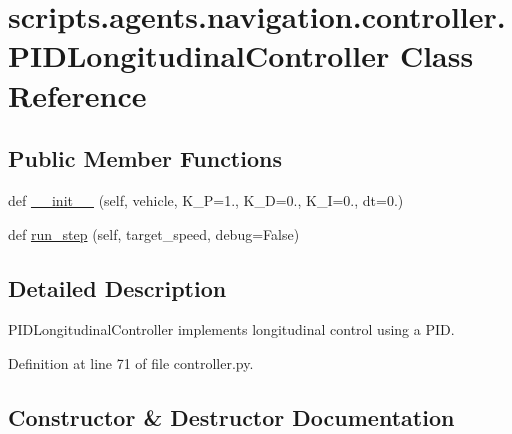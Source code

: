 \hypertarget{classscripts_1_1agents_1_1navigation_1_1controller_1_1PIDLongitudinalController}{}\section{scripts.\+agents.\+navigation.\+controller.\+P\+I\+D\+Longitudinal\+Controller Class Reference}
\label{classscripts_1_1agents_1_1navigation_1_1controller_1_1PIDLongitudinalController}
\subsection*{Public Member Functions}
\begin{DoxyCompactItemize}
\item 
def \hyperlink{classscripts_1_1agents_1_1navigation_1_1controller_1_1PIDLongitudinalController_a9b71d9ff7c2846a6c26712d468069372}{\+\_\+\+\_\+init\+\_\+\+\_\+} (self, vehicle, K\+\_\+P=1., K\+\_\+D=0., K\+\_\+I=0., dt=0.)
\item 
def \hyperlink{classscripts_1_1agents_1_1navigation_1_1controller_1_1PIDLongitudinalController_a471042867b5f536887249e9d49c6ba81}{run\+\_\+step} (self, target\+\_\+speed, debug=False)
\end{DoxyCompactItemize}


\subsection{Detailed Description}
\begin{DoxyVerb}PIDLongitudinalController implements longitudinal control using a PID.
\end{DoxyVerb}
 

Definition at line 71 of file controller.\+py.



\subsection{Constructor \& Destructor Documentation}
\mbox{\label{classscripts_1_1agents_1_1navigation_1_1controller_1_1PIDLongitudinalController_a9b71d9ff7c2846a6c26712d468069372}} 
